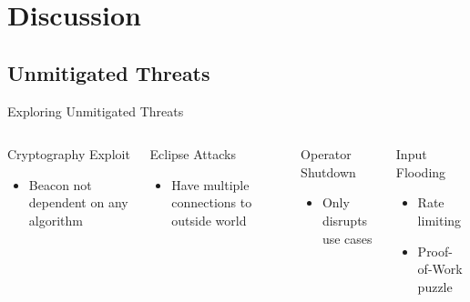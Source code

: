 \section{Discussion}


\subsection{Unmitigated Threats}

\begin{frame}{Exploring Unmitigated Threats}
    \begin{columns}[T,onlytextwidth]
        \pause

        \begin{block}{Cryptography Exploit}
            \begin{itemize}

                \item Beacon not dependent on any algorithm
            \end{itemize}
        \end{block}
        \pause
        \begin{block}{Eclipse Attacks}
            \begin{itemize}
                \item Have multiple connections to outside world
            \end{itemize}
        \end{block}

        \pause
        \begin{block}{Operator Shutdown}
            \begin{itemize}
                \item Only disrupts use cases
            \end{itemize}
        \end{block}

        \pause
        \begin{block}{Input Flooding}
          \begin{itemize}
              \item Rate limiting
              \item Proof-of-Work puzzle
          \end{itemize}
        \end{block}

    \end{columns}
\end{frame}

